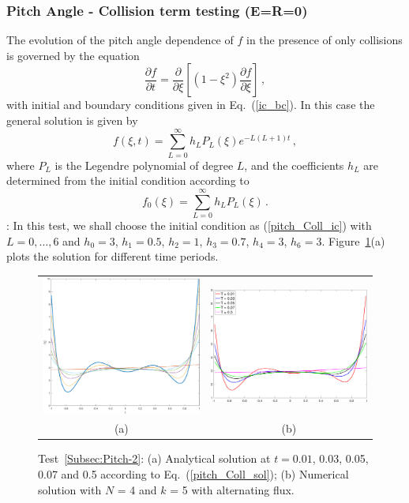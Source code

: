 \documentclass[preprint,11pt]{elsarticle}
\newcommand{\bq}{\begin{equation}}
\newcommand{\eq}{\end{equation}}
\begin{document}
\subsubsection{Pitch Angle - Collision term testing (E=R=0)}
\label{sec:pitch-angle-C}
The evolution of the pitch angle dependence of $f$ in the presence of only collisions is governed by the equation
%
\bq
\label{pitch_Coll_eq}
\frac{\partial f}{\partial t}= \frac{\partial}{\partial\xi} \left[ \left(1-\xi^2\right) \frac{\partial f}{\partial \xi} \right] \, ,
\eq
%
with initial and boundary conditions given in Eq.~(\ref{ic_bc}).
In this case the general solution is given by 
%
\bq
\label{pitch_Coll_sol}
 f(\xi, t)=\sum_{L=0}^\infty h_L P_L(\xi) e^{-L(L+1) t}\, ,
\eq
%
where $P_L$ is the Legendre polynomial of degree $L$, and the coefficients $h_L$ are determined from the initial condition according to
%
\bq
\label{pitch_Coll_ic}
 f_0(\xi)=\sum_{L=0}^\infty h_L P_L(\xi)\, .
\eq
%
: 
In this test, we shall choose the initial condition as (\ref{pitch_Coll_ic}) with $L=0,\dots,6$ and $h_0=3$,  $h_1=0.5$,  $h_2=1$,  $h_3=0.7$,  $h_4=3$,  $h_6=3$.
Figure~\ref{Fig:pitch_coll}(a) plots the solution for different time periods.
%
\begin{figure}[H]
\centering
\begin{tabular}{cc}
 \includegraphics[width=.45\textwidth]{FIGURES/fig_Coll_time-eps-converted-to}
  &\includegraphics[width=.45\textwidth,height=.4\textwidth]{./NumFig/Diff-Deg5_Lev4}\\
  \footnotesize (a) & \footnotesize(b) 
\end{tabular}
\caption{Test~\ref{Subsec:Pitch-2}: (a) Analytical solution at 
$t=0.01$, 0.03, 0.05, 0.07 and 0.5 according to Eq.~(\ref{pitch_Coll_sol}); (b) Numerical solution with $N$ = 4 and $k$ = 5 with alternating flux.}\label{Fig:pitch_coll}
\end{figure}
\end{document}

